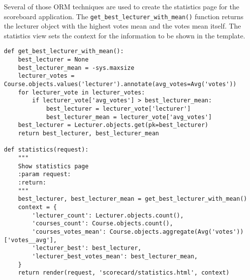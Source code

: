 Several of those ORM techniques are used to create the statistics page for the scoreboard application. The \lstinline|get_best_lecturer_with_mean()| function returns the lecturer object with the highest votes mean and the votes mean itself. The statistics view sets the context for the information to be shown in the template.
\begin{lstlisting}[style=Python, caption=Statistics view, label=lst:statistics_view]
def get_best_lecturer_with_mean():
    best_lecturer = None
    best_lecturer_mean = -sys.maxsize
    lecturer_votes = Course.objects.values('lecturer').annotate(avg_votes=Avg('votes'))
    for lecturer_vote in lecturer_votes:
        if lecturer_vote['avg_votes'] > best_lecturer_mean:
            best_lecturer = lecturer_vote['lecturer']
            best_lecturer_mean = lecturer_vote['avg_votes']
    best_lecturer = Lecturer.objects.get(pk=best_lecturer)
    return best_lecturer, best_lecturer_mean
    
def statistics(request):
    """
    Show statistics page
    :param request:
    :return:
    """
    best_lecturer, best_lecturer_mean = get_best_lecturer_with_mean()
    context = {
        'lecturer_count': Lecturer.objects.count(),
        'courses_count': Course.objects.count(),
        'courses_votes_mean': Course.objects.aggregate(Avg('votes'))['votes__avg'],
        'lecturer_best': best_lecturer,
        'lecturer_best_votes_mean': best_lecturer_mean,
    }
    return render(request, 'scorecard/statistics.html', context)
\end{lstlisting}